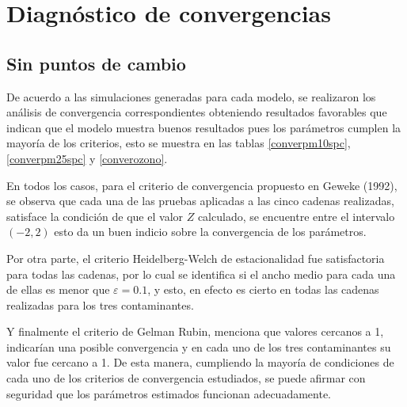 \section{Diagnóstico de convergencias}

\subsection{Sin puntos de cambio}
De acuerdo a las simulaciones generadas para cada modelo, se realizaron los análisis de convergencia correspondientes obteniendo resultados favorables que indican que el modelo muestra buenos resultados pues los parámetros cumplen la mayoría de los criterios, esto se muestra en las tablas \ref{converpm10spc}, \ref{converpm25spc} y 
\ref{converozono}. 

En todos los casos, para el criterio de convergencia propuesto en Geweke (1992), se observa que cada una de las pruebas aplicadas a las cinco cadenas realizadas, satisface la condición de que el valor $Z$ calculado, se encuentre entre el intervalo $(-2,2)$ esto da un buen indicio sobre la convergencia de los parámetros. 

Por otra parte, el criterio Heidelberg-Welch de estacionalidad fue  satisfactoria para todas las cadenas, por lo cual se identifica si el ancho medio para cada una de ellas es menor que $\varepsilon =0.1 $, y esto, en efecto es cierto en todas las cadenas realizadas para los tres contaminantes. 

Y finalmente el criterio de Gelman Rubin, menciona que valores cercanos a 1, indicarían una posible convergencia y en cada uno de los tres contaminantes su valor fue cercano a 1. De esta manera, cumpliendo la mayoría de condiciones de cada uno de los criterios de convergencia estudiados, se puede afirmar con seguridad que los parámetros estimados  funcionan adecuadamente. 




